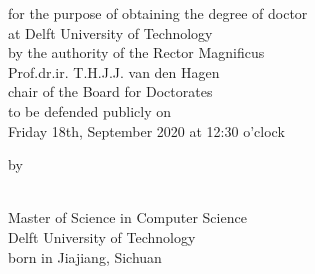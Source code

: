 \begin{small}

\begin{center}for the purpose of obtaining the degree of doctor\\
\vspace{1mm}
at Delft University of Technology\\
\vspace{1mm}
by the authority of the Rector Magnificus\\
\vspace{1mm}
Prof.dr.ir. T.H.J.J. van den Hagen\\
\vspace{1mm}
chair of the Board for Doctorates\\
\vspace{1mm}
to be defended publicly on\\
\vspace{1mm}
Friday 18th, September 2020 at 12:30 o'clock
\vspace{1mm}
\vspace{10mm} %

by

\vspace{10mm}
\textbf{\theauthor}\\
\vspace{1mm}
Master of Science in Computer Science\\
\vspace{1mm}
Delft University of Technology\\
\vspace{1mm}
born in Jiajiang, Sichuan
\vspace{1mm}
\end{center}

\end{small}


